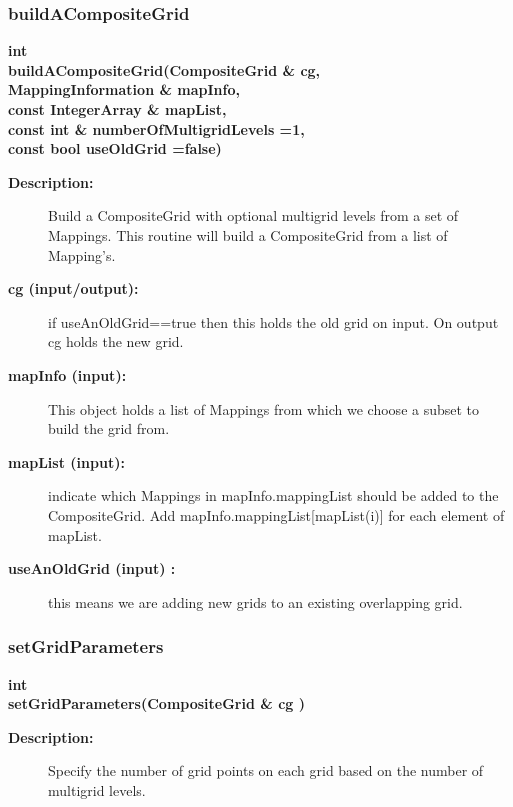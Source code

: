 \subsubsection{buildACompositeGrid}
 
\newlength{\ogenIncludeArgIndent}
\begin{flushleft} \textbf{%
int  \\ 
\settowidth{\ogenIncludeArgIndent}{buildACompositeGrid(}%
buildACompositeGrid(CompositeGrid \& cg, \\ 
\hspace{\ogenIncludeArgIndent}MappingInformation \& mapInfo, \\ 
\hspace{\ogenIncludeArgIndent}const IntegerArray \& mapList,\\ 
\hspace{\ogenIncludeArgIndent}const int \& numberOfMultigridLevels  =1,\\ 
\hspace{\ogenIncludeArgIndent}const bool useOldGrid  =false)
}\end{flushleft}
\begin{description}
\item[{\bf Description:}] 
   Build a CompositeGrid with optional multigrid levels from a set of Mappings.
  This routine will build a CompositeGrid from a list of Mapping's. 
  
\item[{\bf cg (input/output):}]  if useAnOldGrid==true then this holds the old grid on input. On output cg
 holds the new grid.
\item[{\bf mapInfo (input):}]  This object holds a list of Mappings from which we choose a subset to build the grid from.
\item[{\bf mapList (input):}]  indicate which Mappings in mapInfo.mappingList should be added to the CompositeGrid.
    Add mapInfo.mappingList[mapList(i)] for each element of mapList.
\item[{\bf useAnOldGrid (input) :}]  this means we are adding new grids to an existing overlapping grid.
\end{description}
\subsubsection{setGridParameters}
 
\begin{flushleft} \textbf{%
int  \\ 
\settowidth{\ogenIncludeArgIndent}{setGridParameters(}%
setGridParameters(CompositeGrid \& cg )
}\end{flushleft}
\begin{description}
\item[{\bf Description:}] 
     Specify the number of grid points on each grid based on the number of multigrid levels.

\end{description}
